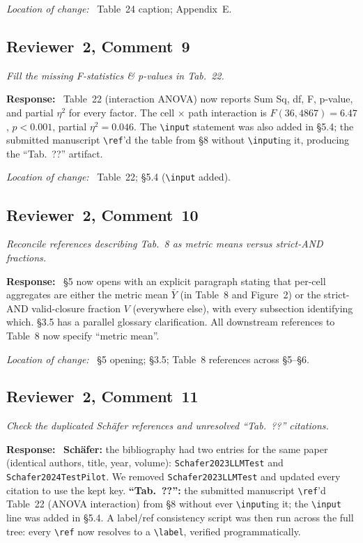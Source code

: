 \documentclass[11pt,a4paper]{article}
\newenvironment{reviewerquote}
  {\begin{tcolorbox}[colback=black!5, colframe=black!15, boxrule=0.3pt,
                     arc=1pt, left=6pt, right=6pt, top=3pt, bottom=3pt,
                     breakable]\itshape\small}
  {\end{tcolorbox}}
\newcommand{\rcomment}[2]{\subsection*{Reviewer~#1, Comment~#2}}
\newcommand{\response}{\noindent\textbf{Response:}\ }
\newcommand{\loc}{\par\smallskip\noindent\textit{Location of change:}\ }
\begin{document}
\loc{} Table~24 caption; Appendix~E.

\rcomment{2}{9}

\begin{reviewerquote}
Fill the missing F-statistics \& p-values in Tab.\ 22.
\end{reviewerquote}

\response{}
Table~22 (interaction ANOVA) now reports Sum Sq, df, F, p-value, and partial $\eta^2$ for every factor. The cell $\times$ path interaction is $F(36, 4867) = 6.47$, $p < 0.001$, partial $\eta^2 = 0.046$. The \texttt{\textbackslash input} statement was also added in \S5.4; the submitted manuscript \texttt{\textbackslash ref}'d the table from \S8 without \texttt{\textbackslash input}ing it, producing the ``Tab.\ ??'' artifact.

\loc{} Table~22; \S5.4 (\texttt{\textbackslash input} added).

\rcomment{2}{10}

\begin{reviewerquote}
Reconcile references describing Tab.\ 8 as metric means versus strict-AND fractions.
\end{reviewerquote}

\response{}
\S5 now opens with an explicit paragraph stating that per-cell aggregates are either the metric mean $\bar{Y}$ (in Table~8 and Figure~2) or the strict-AND valid-closure fraction $V$ (everywhere else), with every subsection identifying which. \S3.5 has a parallel glossary clarification. All downstream references to Table~8 now specify ``metric mean''.

\loc{} \S5 opening; \S3.5; Table~8 references across \S5--\S6.

\rcomment{2}{11}

\begin{reviewerquote}
Check the duplicated Schäfer references and unresolved ``Tab.\ ??'' citations.
\end{reviewerquote}

\response{}
\textbf{Schäfer:} the bibliography had two entries for the same paper (identical authors, title, year, volume): \texttt{Schafer2023LLMTest} and \texttt{Schafer2024TestPilot}. We removed \texttt{Schafer2023LLMTest} and updated every citation to use the kept key. \textbf{``Tab.\ ??'':} the submitted manuscript \texttt{\textbackslash ref}'d Table~22 (ANOVA interaction) from \S8 without ever \texttt{\textbackslash input}ing it; the \texttt{\textbackslash input} line was added in \S5.4. A label/ref consistency script was then run across the full tree: every \texttt{\textbackslash ref} now resolves to a \texttt{\textbackslash label}, verified programmatically.
\end{document}
